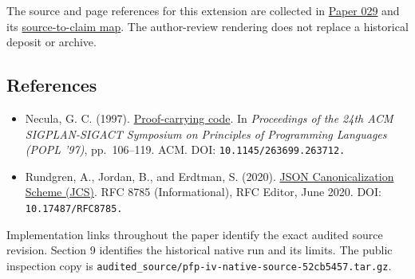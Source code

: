 \documentclass[
  11pt,
]{article}
\providecommand{\tightlist}{%
  \setlength{\itemsep}{0pt}\setlength{\parskip}{0pt}}
\begin{document}
The source and page references for this extension are collected in
\href{../029/paper.pdf}{Paper 029} and its
\href{../029/docs/source_to_claim_map.md}{source-to-claim map}. The
author-review rendering does not replace a historical deposit or
archive.

\subsection{References}\label{references}

\begin{itemize}
\tightlist
\item
  Necula, G. C. (1997).
  \href{https://doi.org/10.1145/263699.263712}{Proof-carrying code}. In
  \emph{Proceedings of the 24th ACM SIGPLAN-SIGACT Symposium on
  Principles of Programming Languages (POPL '97)}, pp.~106--119. ACM.
  DOI: \nolinkurl{10.1145/263699.263712.}
\item
  Rundgren, A., Jordan, B., and Erdtman, S. (2020).
  \href{https://doi.org/10.17487/RFC8785}{JSON Canonicalization Scheme
  (JCS)}. RFC 8785 (Informational), RFC Editor, June 2020. DOI:
  \nolinkurl{10.17487/RFC8785.}
\end{itemize}

Implementation links throughout the paper identify the exact audited
source revision. Section 9 identifies the historical native run and its
limits. The public inspection copy is
\nolinkurl{audited_source/pfp-iv-native-source-52cb5457.tar.gz}.
\end{document}
